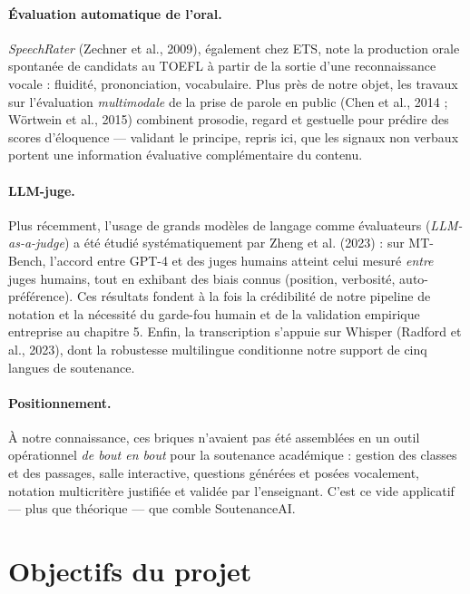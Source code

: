 \documentclass[12pt,a4paper]{report}
\begin{document}
\paragraph{Évaluation automatique de l'oral.} \emph{SpeechRater} (Zechner
et al., 2009), également chez ETS, note la production orale spontanée de
candidats au TOEFL à partir de la sortie d'une reconnaissance vocale :
fluidité, prononciation, vocabulaire. Plus près de notre objet, les travaux
sur l'évaluation \emph{multimodale} de la prise de parole en public (Chen
et al., 2014 ; Wörtwein et al., 2015) combinent prosodie, regard et gestuelle
pour prédire des scores d'éloquence --- validant le principe, repris ici, que
les signaux non verbaux portent une information évaluative complémentaire du
contenu.

\paragraph{LLM-juge.} Plus récemment, l'usage de grands modèles de langage
comme évaluateurs (\emph{LLM-as-a-judge}) a été étudié systématiquement par
Zheng et al. (2023) : sur MT-Bench, l'accord entre GPT-4 et des juges humains
atteint celui mesuré \emph{entre} juges humains, tout en exhibant des biais
connus (position, verbosité, auto-préférence). Ces résultats fondent à la fois
la crédibilité de notre pipeline de notation et la nécessité du garde-fou
humain et de la validation empirique entreprise au chapitre 5. Enfin, la
transcription s'appuie sur Whisper (Radford et al., 2023), dont la robustesse
multilingue conditionne notre support de cinq langues de soutenance.

\paragraph{Positionnement.} À notre connaissance, ces briques n'avaient pas
été assemblées en un outil opérationnel \emph{de bout en bout} pour la
soutenance académique : gestion des classes et des passages, salle
interactive, questions générées et posées vocalement, notation multicritère
justifiée et validée par l'enseignant. C'est ce vide applicatif --- plus que
théorique --- que comble SoutenanceAI.

\section{Objectifs du projet}
\end{document}
